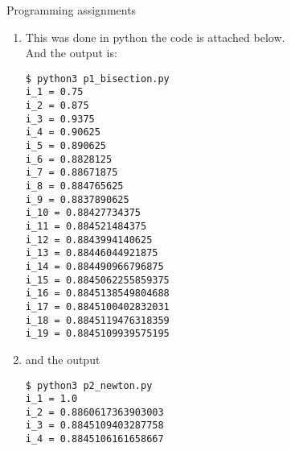 \documentclass[a4paper]{article}
\begin{document}
\begin{section}{Programming assignments}
	\begin{enumerate}
		\item
		This was done in python the code is attached below.\\
		
		And the output is:\\
		\begin{lstlisting}
$ python3 p1_bisection.py 
i_1 = 0.75
i_2 = 0.875
i_3 = 0.9375
i_4 = 0.90625
i_5 = 0.890625
i_6 = 0.8828125
i_7 = 0.88671875
i_8 = 0.884765625
i_9 = 0.8837890625
i_10 = 0.88427734375
i_11 = 0.884521484375
i_12 = 0.8843994140625
i_13 = 0.88446044921875
i_14 = 0.884490966796875
i_15 = 0.8845062255859375
i_16 = 0.8845138549804688
i_17 = 0.8845100402832031
i_18 = 0.8845119476318359
i_19 = 0.8845109939575195
\end{lstlisting}

\item
	
	and the output
	\begin{lstlisting}
$ python3 p2_newton.py 
i_1 = 1.0
i_2 = 0.8860617363903003
i_3 = 0.8845109403287758
i_4 = 0.8845106161658667
\end{lstlisting}
\end{enumerate}
\end{section}
\end{document}
